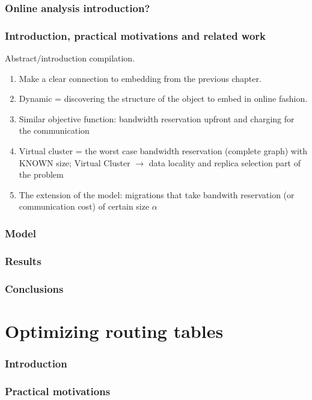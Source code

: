 \documentclass[a4paper]{article}
\begin{document}
\subsubsection{Online analysis introduction?}

\subsubsection{Introduction, practical motivations and related work}

Abstract/introduction compilation.

\begin{enumerate}
  \item Make a clear connection to embedding from the previous chapter.
  \item Dynamic = discovering the structure of the object to embed in online fashion.
  \item Similar objective function: bandwidth reservation upfront and charging for the communication
  \item Virtual cluster = the worst case bandwidth reservation (complete graph) with KNOWN size; Virtual Cluster $\rightarrow$ data locality and replica selection part of the problem
  \item The extension of the model: migrations that take bandwith reservation (or communication cost) of certain size $\alpha$
\end{enumerate}

\subsubsection{Model}
\subsubsection{Results}
\subsubsection{Conclusions}


\section{Optimizing routing tables}

\subsubsection{Introduction}
\subsubsection{Practical motivations}
\end{document}
